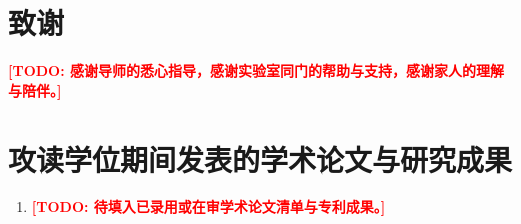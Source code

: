 \documentclass[12pt,a4paper,openany,UTF8]{ctexrep}
\providecommand{\TODO}[1]{\textcolor{red}{\textbf{[TODO: #1]}}}
\begin{document}
\setcounter{page}{1}









\chapter*{致谢}
\TODO{感谢导师的悉心指导，感谢实验室同门的帮助与支持，感谢家人的理解与陪伴。}
\newpage

\chapter*{攻读学位期间发表的学术论文与研究成果}
\begin{enumerate}
  \item \TODO{待填入已录用或在审学术论文清单与专利成果。}
\end{enumerate}
\end{document}
